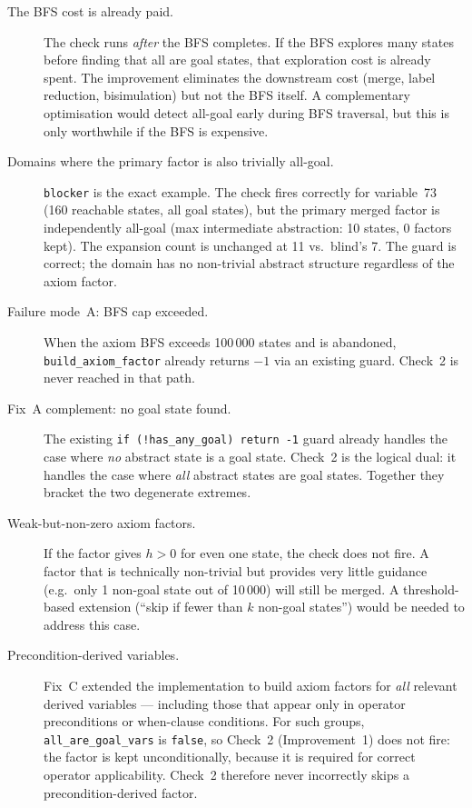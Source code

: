 \documentclass[11pt,a4paper]{article}
\begin{document}
\begin{description}
  \item[The BFS cost is already paid.]
    The check runs \emph{after} the BFS completes.  If the BFS explores many
    states before finding that all are goal states, that exploration cost is
    already spent.  The improvement eliminates the downstream cost (merge, label
    reduction, bisimulation) but not the BFS itself.  A complementary
    optimisation would detect all-goal early during BFS traversal, but this is
    only worthwhile if the BFS is expensive.

  \item[Domains where the primary factor is also trivially all-goal.]
    \texttt{blocker} is the exact example.  The check fires correctly for
    variable~73 (160 reachable states, all goal states), but the primary merged
    factor is independently all-goal (max intermediate abstraction: 10 states,
    0 factors kept).  The expansion count is unchanged at 11 vs.\ blind's 7.
    The guard is correct; the domain has no non-trivial abstract structure
    regardless of the axiom factor.

  \item[Failure mode~A: BFS cap exceeded.]
    When the axiom BFS exceeds 100\,000 states and is abandoned,
    \texttt{build\_axiom\_factor} already returns $-1$ via an existing guard.
    Check~2 is never reached in that path.

  \item[Fix~A complement: no goal state found.]
    The existing \texttt{if (!has\_any\_goal) return -1} guard already handles
    the case where \emph{no} abstract state is a goal state.  Check~2 is the
    logical dual: it handles the case where \emph{all} abstract states are goal
    states.  Together they bracket the two degenerate extremes.

  \item[Weak-but-non-zero axiom factors.]
    If the factor gives $h > 0$ for even one state, the check does not fire.
    A factor that is technically non-trivial but provides very little guidance
    (e.g.\ only 1 non-goal state out of 10\,000) will still be merged.  A
    threshold-based extension (``skip if fewer than $k$ non-goal states'') would
    be needed to address this case.

  \item[Precondition-derived variables.]
    Fix~C extended the implementation to build axiom factors for \emph{all}
    relevant derived variables — including those that appear only in operator
    preconditions or when-clause conditions.  For such groups,
    \texttt{all\_are\_goal\_vars} is \texttt{false}, so Check~2 (Improvement~1)
    does not fire: the factor is kept unconditionally, because it is required for
    correct operator applicability.  Check~2 therefore never incorrectly skips a
    precondition-derived factor.
\end{description}
\end{document}
